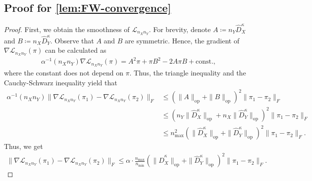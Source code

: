 \documentclass{article}
\begin{document}
\subsection{Proof for \cref{lem:FW-convergence}}\label{pf:lem:FW-convergence}
\begin{proof}
	First, we obtain the smoothness of $\mathcal{L}_{n_Xn_Y}$. For brevity, denote $A \coloneqq n_Y \hat{D}_X^\kappa$ and $B \coloneqq n_X \hat{D}_Y^\kappa$. Observe that $A$ and $B$ are symmetric. Hence, the gradient of $\nabla \mathcal{L}_{n_Xn_Y}(\pi)$ can be calculated as
	\begin{align*}
		\alpha^{-1}(n_Xn_Y)\nabla \mathcal{L}_{n_Xn_Y}(\pi) = A^2\pi + \pi B^2 - 2A \pi B + \mathrm{const.} ,
	\end{align*}
	where the constant does not depend on $\pi$. Thus, the triangle inequality and the Cauchy-Schwarz inequality yield that
	\begin{align*}
		\alpha^{-1}(n_Xn_Y) \Big\| \nabla \mathcal{L}_{n_Xn_Y}(\pi_1) - \nabla \mathcal{L}_{n_Xn_Y}(\pi_2) \Big\|_F &\leq \left(\|A\|_{\mathrm{op}} + \|B\|_{\mathrm{op}}\right)^2\| \pi_1 - \pi_2 \|_F \\
		&\leq \left(n_Y\|\hat{D}_X^\kappa\|_{\mathrm{op}} + n_X\|\hat{D}_Y^\kappa\|_{\mathrm{op}}\right)^2\| \pi_1 - \pi_2 \|_F \\
		&\leq n_{\max}^2 \left(\|\hat{D}_X^\kappa\|_{\mathrm{op}} + \|\hat{D}_Y^\kappa\|_{\mathrm{op}}\right)^2\| \pi_1 - \pi_2 \|_F .
	\end{align*}
	Thus, we get
	\begin{align}
		\label{eq:beta-smooth}
		\Big\| \nabla \mathcal{L}_{n_Xn_Y}(\pi_1) - \nabla \mathcal{L}_{n_Xn_Y}(\pi_2) \Big\|_F \leq \alpha \cdot \frac{n_{\max}}{n_{\min}} \left(\|\hat{D}_X^\kappa\|_{\mathrm{op}} + \|\hat{D}_Y^\kappa\|_{\mathrm{op}}\right)^2 \|\pi_1 - \pi_2\|_F .
	\end{align} 
	

\end{proof}
\end{document}
